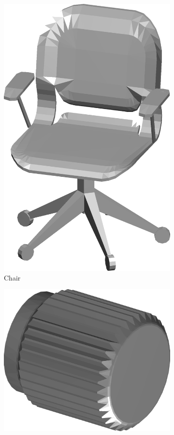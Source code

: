 \begin{figure}
\begin{subfigure}[t]{0.19\linewidth}
		\includegraphics[width=0.7\linewidth]{./fig/eval/07chair.png}  
		\caption{Chair} 	
	\end{subfigure}
	\begin{subfigure}[t]{0.19\linewidth} \centering
		\includegraphics[width=1\linewidth]{./fig/eval/08cog.png}  

\end{subfigure}
\end{figure}

